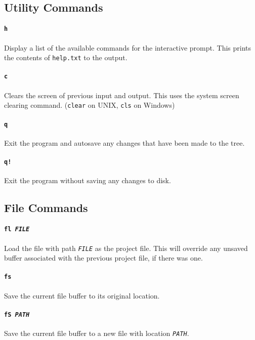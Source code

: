 \documentclass[a4paper]{article}
\begin{document}
\subsection{Utility Commands}

\paragraph{\texttt{h}}
Display a list of the available commands for the interactive prompt. This 
prints the contents of \texttt{help.txt}  to the output.

\paragraph{\texttt{c}}
Clears the screen of previous input and output. This uses the system screen 
clearing command. (\texttt{clear} on UNIX, \texttt{cls} on Windows)

\paragraph{\texttt{q}}
Exit the program and autosave any changes that have been made to the tree.

\paragraph{\texttt{q!}}
Exit the program without saving any changes to disk.

\subsection{File Commands}

\paragraph{\texttt{fl \textit{FILE}}}
Load the file with path \texttt{\textit{FILE}} as the project file. This will 
override any unsaved buffer associated with the previous project file, if there 
was one.

\paragraph{\texttt{fs}}
Save the current file buffer to its original location.

\paragraph{\texttt{fS \textit{PATH}}}
Save the current file buffer to a new file with location \texttt{\textit{PATH}}.
\end{document}
